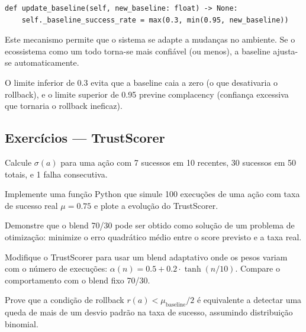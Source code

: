 \begin{lstlisting}[style=pythonstyle]
def update_baseline(self, new_baseline: float) -> None:
    self._baseline_success_rate = max(0.3, min(0.95, new_baseline))
\end{lstlisting}

Este mecanismo permite que o sistema se adapte a mudanças no ambiente.
Se o ecossistema como um todo torna-se mais confiável (ou menos), a
baseline ajusta-se automaticamente.

\begin{observacao}
O limite inferior de 0.3 evita que a baseline caia a zero (o que
desativaria o rollback), e o limite superior de 0.95 previne
complacency (confiança excessiva que tornaria o rollback ineficaz).
\end{observacao}

\subsection{Exercícios — TrustScorer}
\begin{exercicio}
Calcule $\sigma(a)$ para uma ação com 7 sucessos em 10 recentes,
30 sucessos em 50 totais, e 1 falha consecutiva.
\end{exercicio}
\begin{exercicio}
Implemente uma função Python que simule 100 execuções de uma ação
com taxa de sucesso real $\mu = 0.75$ e plote a evolução do
TrustScorer.
\end{exercicio}
\begin{exercicio}
Demonstre que o blend 70/30 pode ser obtido como solução de um
problema de otimização: minimize o erro quadrático médio entre o
score previsto e a taxa real.
\end{exercicio}
\begin{exercicio}
Modifique o TrustScorer para usar um blend adaptativo onde os pesos
variam com o número de execuções: $\alpha(n) = 0.5 + 0.2 \cdot
\tanh(n/10)$. Compare o comportamento com o blend fixo 70/30.
\end{exercicio}
\begin{exercicio}
Prove que a condição de rollback $r(a) < \mu_{\text{baseline}} / 2$
é equivalente a detectar uma queda de mais de um desvio padrão na
taxa de sucesso, assumindo distribuição binomial.
\end{exercicio}

